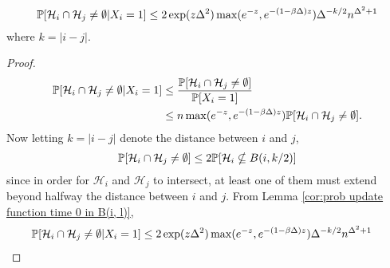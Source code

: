 \begin{lemma}
	\label{lem:intersecting histories bound given X_j = 1}
	\begin{equation}
		\mathbb{P}[\mathcal{H}_{i} \cap \mathcal{H}_j \neq \emptyset | X_i = 1] \leq  2 \exp(z \Delta^2) \max(e^{-z}, e^{-(1 - \beta\Delta)z})\Delta^{-k/2} n^{\Delta^2 + 1}
	\end{equation}
	where $k = |i - j|$.
\end{lemma}
\begin{proof}
	\begin{align}
		\mathbb{P}[\mathcal{H}_{i} \cap \mathcal{H}_j \neq \emptyset | X_i = 1]  &\leq \frac{\mathbb{P}[\mathcal{H}_{i} \cap \mathcal{H}_j \neq \emptyset] }{\mathbb{P}[X_i = 1]}\\
		&\leq n \max(e^{-z}, e^{-(1 - \beta\Delta)z}) \mathbb{P}[\mathcal{H}_{i} \cap \mathcal{H}_j \neq \emptyset].
	\end{align}
	Now letting $k = |i - j|$ denote the distance between $i$ and $j$,
	\begin{equation}
		\mathbb{P}[\mathcal{H}_{i} \cap \mathcal{H}_j \neq \emptyset] \leq 2 \mathbb{P}[\mathcal{H}_i \nsubseteq B(i, k/2) ]
	\end{equation}
	since in order for $\mathcal{H}_i$ and $\mathcal{H}_j$ to intersect, at least one of them must extend beyond halfway the distance between $i$ and $j$. From Lemma \ref{cor:prob update function time 0 in B(i, l)},
	\begin{align}
		\mathbb{P}[\mathcal{H}_{i} \cap \mathcal{H}_j \neq \emptyset | X_i = 1] &\leq 2 \exp(z \Delta^2) \max(e^{-z}, e^{-(1 - \beta\Delta)z})\Delta^{-k/2} n^{\Delta^2 + 1}
	\end{align}
\end{proof}

